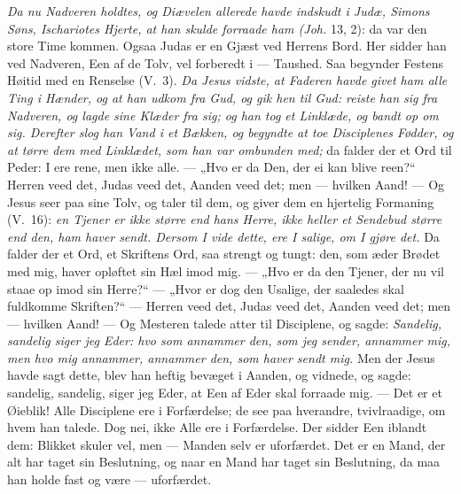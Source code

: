 \documentclass[12pt,a4paper]{book}
\begin{document}
\emph{Da nu Nadveren holdtes, og Diævelen allerede havde indskudt i Judæ, Simons Søns,
Ischariotes Hjerte, at han skulde forraade ham (Joh.} 13, 2): da var den store Time kommen.
Ogsaa Judas er en Gjæst ved Herrens Bord. Her sidder han ved Nadveren, Een af de Tolv, vel
forberedt i --- Taushed. Saa begynder Festens Høitid med en Renselse (V.\ 3). \emph{Da Jesus
vidste, at Faderen havde givet ham alle Ting i Hænder, og at han udkom fra Gud, og gik hen
til Gud: reiste han sig fra Nadveren, og lagde sine Klæder fra sig; og han tog et Linklæde,
og bandt op om sig. Derefter slog han Vand i et Bækken, og begyndte at toe Disciplenes
Fødder, og at tørre dem med Linklædet, som han var ombunden med;} da falder der et Ord til
Peder: I ere rene, men ikke alle. --- „Hvo er da Den, der ei kan blive reen?“ Herren veed
det, Judas veed det, Aanden veed det; men --- hvilken Aand! --- Og Jesus seer paa sine Tolv,
og taler til dem, og giver dem en hjertelig Formaning
(V.\ 16): \emph{en Tjener er ikke større end hans Herre, ikke heller et Sendebud større end
den, ham haver sendt. Dersom I vide dette, ere I salige, om I gjøre det.} Da falder der et
Ord, et Skriftens Ord, saa strengt og tungt: den, som æder Brødet med mig, haver opløftet sin
Hæl imod mig. --- „Hvo er da den Tjener, der nu vil staae op imod sin Herre?“ --- „Hvor er
dog den Usalige, der saaledes skal fuldkomme Skriften?“ --- Herren veed det, Judas veed det,
Aanden veed det; men --- hvilken Aand! --- Og Mesteren talede atter til Disciplene, og sagde:
\emph{Sandelig, sandelig siger jeg Eder: hvo som annammer den, som jeg sender, annammer mig,
men hvo mig annammer, annammer den, som haver sendt mig.} Men der Jesus havde sagt dette,
blev han heftig bevæget i Aanden, og vidnede, og sagde: sandelig, sandelig, siger jeg Eder,
at Een af Eder skal forraade mig. --- Det er et Øieblik! Alle Disciplene ere i Forfærdelse;
de see paa hverandre, tvivlraadige, om hvem han talede. Dog nei, ikke Alle ere i
Forfærdelse. Der sidder Een iblandt dem: Blikket skuler vel, men --- Manden selv er
uforfærdet. Det er en Mand, der alt har taget sin Beslutning, og naar en Mand har taget sin
Beslutning, da maa han holde fast og være --- uforfærdet.
\end{document}
